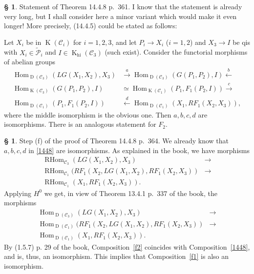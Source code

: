 \documentclass[12pt]{article}
\theoremstyle{remark}
\theoremstyle{definition}
\newtheorem{s}[thm]{\S}
\newcommand{\C}{\mathcal C}
\newcommand{\mc}{\mathcal}
\newcommand{\oo}{\operatorname}
\newcommand{\xr}{\xrightarrow}
\DeclareMathOperator{\Hom}{Hom}%
\begin{document}
%
%
\begin{s}
Statement of Theorem 14.4.8 p.~361. I know that the statement is already very long, but I shall consider here a minor variant which would make it even longer! More precisely, (14.4.5) could be stated as follows:

Let $X_i$ be in $\oo K(\C_i)$ for $i=1,2,3$, and let $P_i\to X_i$ ($i=1,2$) and $X_3\to I$ be qis with $X_i\in\widetilde{\mc P}_i$ and $I\in\oo K_{\oo{hi}}(\C_3)$ (such exist). Consider the functorial morphisms of abelian groups
\begin{equation}\label{1448}
\begin{split}
\Hom_{\oo D(\C_3)}(LG(X_1,X_2),X_3)&\xr a\Hom_{\oo D(\C_3)}(G(P_1,P_2),I)\xleftarrow b\\ 
\Hom_{\oo K(\C_3)}(G(P_1,P_2),I)&\simeq\Hom_{\oo K(\C_1)}(P_1,F_1(P_2,I))\xr c\\ 
\Hom_{\oo D(\C_1)}(P_1,F_1(P_2,I))&\xleftarrow d\Hom_{\oo D(\C_1)}(X_1,RF_1(X_2,X_3)),
\end{split}
\end{equation}
where the middle isomorphism is the obvious one. Then $a,b,c,d$ are isomorphisms. There is an analogous statement for $F_2$.
\end{s}
%
%
\begin{s}
Step (f) of the proof of Theorem 14.4.8 p.~364. We already know that $a,b,c,d$ in \eqref{1448} are isomorphisms. As explained in the book, we have morphisms  
\begin{equation}\label{f1}
\begin{split}
\oo{RHom}_{\C_3}(LG(X_1,X_2),X_3)&\to\\ 
\oo{RHom}_{\C_1}(RF_1(X_2,LG(X_1,X_2),RF_1(X_2,X_3))&\to\\ 
\oo{RHom}_{\C_1}(X_1,RF_1(X_2,X_3)).
\end{split}
\end{equation}
Applying $H^0$ we get, in view of Theorem 13.4.1 p.~337 of the book, the morphisms 
\begin{equation}\label{f2}
\begin{split}
\oo{Hom}_{\oo D(\C_3)}(LG(X_1,X_2),X_3)&\to\\ 
\oo{Hom}_{\oo D(\C_1)}(RF_1(X_2,LG(X_1,X_2),RF_1(X_2,X_3))&\to\\ 
\oo{Hom}_{\oo D(\C_1)}(X_1,RF_1(X_2,X_3)).
\end{split}
\end{equation}
By (1.5.7) p. 29 of the book, Composition~\eqref{f2} coincides with Composition~\eqref{1448}, and is, thus, an isomorphism. This implies that Composition~\eqref{f1} is also an isomorphism.
\end{s}
\end{document}
